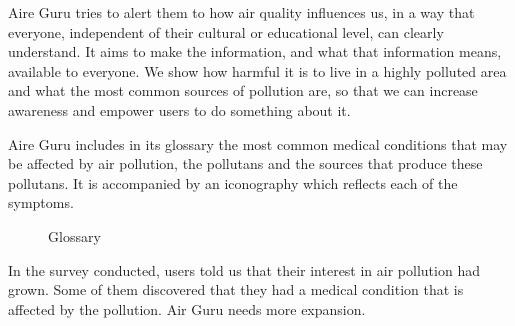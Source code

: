 Aire Guru tries to alert them to how air quality influences us, in a way that everyone, independent of their cultural or educational level,
can clearly understand. It aims to make the information, and what that information means, available to everyone. We show how harmful it is to live in a highly polluted area and what the most common sources of pollution
are, so that we can increase awareness and empower users to do something about it.


Aire Guru includes in its glossary the most common medical conditions that may be affected by air pollution, the pollutans and the sources that produce these pollutans. It is accompanied by an iconography
which reflects each of the symptoms. \\

\begin{figure}[ht]
    \centering
    \hfill
  
  \caption{Glossary}
    \end{figure}
\begin{itemize}
    \done In the survey conducted, users told us that their interest in air pollution had grown. Some of them discovered that they had a medical condition that is affected by the pollution.
    \crossed Air Guru needs more expansion.
    
\end{itemize}
\newpage